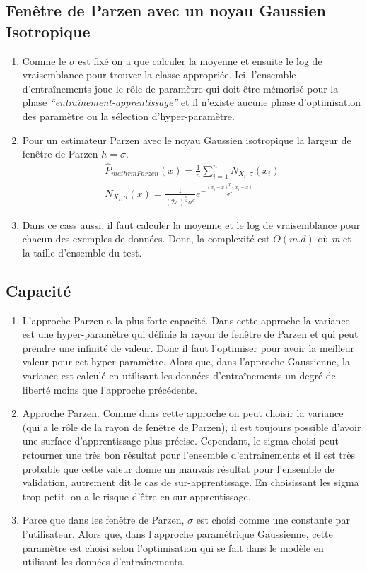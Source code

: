\documentclass{article}
\begin{document}
\subsection{Fenêtre de Parzen avec un noyau Gaussien Isotropique}
\begin{enumerate}[label=(\alph*)]
\item Comme le $\sigma$ est fixé on a que calculer la moyenne et
  ensuite le log de vraisemblance pour trouver la classe appropriée. Ici, l'ensemble d'entraînements
  joue le rôle de paramètre qui doit être mémorisé pour la phase
  \emph{``entraînement-apprentissage''} et il n'existe aucune phase
  d'optimisation des paramètre ou la sélection d'hyper-paramètre.
\item Pour un estimateur Parzen avec le noyau Gaussien isotropique la largeur de fenêtre de Parzen $h=\sigma$.
  \begin{align*}
    \hat{P}_{mathrmParzen}(x) = \frac{1}{n} \sum_{i=1}^{n}N_{X_i , \sigma}(x_i)\\
    N_{X_i , \sigma}(x) = \frac{1}{(2 \pi)^\frac{d}{2} \sigma ^d}e^{-\frac{(x_i - x)^T(x_i - x)}{\sigma ^2}}
  \end{align*}
\item Dans ce cass aussi, il faut calculer la moyenne et le log de
  vraisemblance pour chacun des exemples de données. Donc, la
  complexité est $O(m.d)$ où \emph{m} et la taille d'ensemble du test.
\end{enumerate}

\subsection{Capacité}
\begin{enumerate}[label=(\alph*)]
\item L'approche Parzen a la plus forte
  capacité. Dans cette approche la variance est une hyper-paramètre
  qui définie la rayon de fenêtre de Parzen et qui peut prendre une infinité de valeur. Donc
  il faut l'optimiser pour avoir la meilleur valeur pour
  cet hyper-paramètre. Alors que, dans l'approche Gaussienne, la
  variance est calculé en utilisant les données d'entraînements un
  degré de liberté moins que l'approche précédente.
\item Approche Parzen. Comme dans cette approche on peut choisir
  la variance (qui a le rôle de la rayon de fenêtre de Parzen), il
  est toujours possible d'avoir une surface d'apprentissage plus
  précise. Cependant, le sigma choisi peut retourner une très bon
  résultat pour l'ensemble d'entraînements et il est très probable
  que cette valeur donne un mauvais résultat pour l'ensemble de
  validation, autrement dit le cas de sur-apprentissage. En
  choisissant les sigma trop petit, on a le risque d'être en sur-apprentissage.
\item Parce que dans les fenêtre de Parzen, $\sigma$ est choisi
  comme une constante par l'utilisateur. Alors que, dans l'approche
  paramétrique Gaussienne, cette paramètre est choisi selon
  l'optimisation qui se fait dans le modèle en utilisant les
  données d'entraînements.
\end{enumerate}
\end{document}

